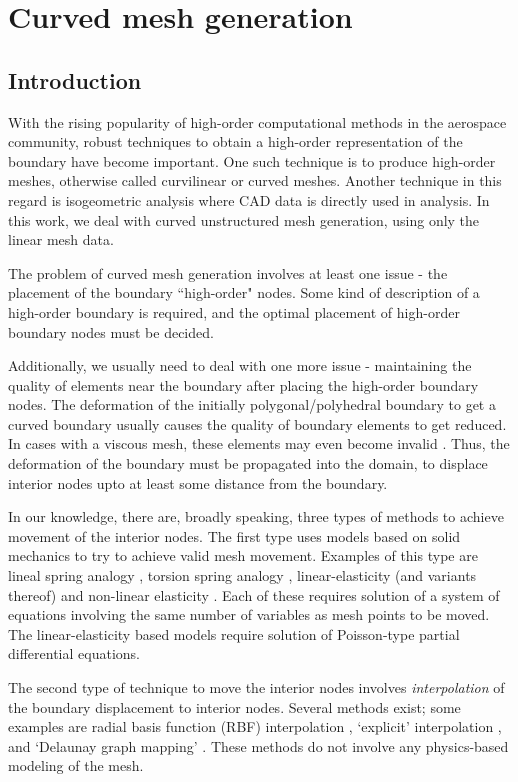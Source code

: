 \chapter{Curved mesh generation}
\section{Introduction}
With the rising popularity of high-order computational methods in the aerospace community, robust techniques to obtain a high-order representation of the boundary have become important. One such technique is to produce high-order meshes, otherwise called curvilinear or curved meshes. Another technique in this regard is isogeometric analysis \cite{isogeometric} where CAD data is directly used in analysis. In this work, we deal with curved unstructured mesh generation, using only the linear mesh data.

The problem of curved mesh generation involves at least one issue - the placement of the boundary ``high-order" nodes. Some kind of description of a high-order boundary is required, and the optimal placement of high-order boundary nodes must be decided.

Additionally, we usually need to deal with one more issue - maintaining the quality of elements near the boundary after placing the high-order boundary nodes. The deformation of the initially polygonal/polyhedral boundary to get a curved boundary usually causes the quality of boundary elements to get reduced. In cases with a viscous mesh, these elements may even become invalid \cite{curve:persson, gmsh:untangling}. Thus, the deformation of the boundary must be propagated into the domain, to displace interior nodes upto at least some distance from the boundary.

In our knowledge, there are, broadly speaking, three types of methods to achieve movement of the interior nodes. The first type uses models based on solid mechanics to try to achieve valid mesh movement. Examples of this type are lineal spring analogy \cite{mm:batina}, torsion spring analogy \cite{mm:torsionsprings}, linear-elasticity (and variants thereof)\cite{curve:hartmann} and non-linear elasticity \cite{curve:persson}. Each of these requires solution of a system of equations involving the same number of variables as mesh points to be moved. The linear-elasticity based models require solution of Poisson-type partial differential equations.

The second type of technique to move the interior nodes involves \emph{interpolation} of the boundary displacement to interior nodes. Several methods exist; some examples are radial basis function (RBF) interpolation \cite{mm:rbf}, `explicit' interpolation \cite{mm:explicit}, and `Delaunay graph mapping' \cite{mm:dgm}. These methods do not involve any physics-based modeling of the mesh.

